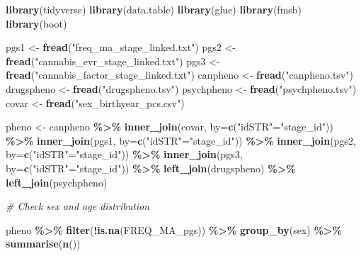\documentclass[
]{article}
\newenvironment{Shaded}{\begin{snugshade}}{\end{snugshade}}
\newcommand{\AttributeTok}[1]{\textcolor[rgb]{0.13,0.29,0.53}{#1}}
\newcommand{\CommentTok}[1]{\textcolor[rgb]{0.56,0.35,0.01}{\textit{#1}}}
\newcommand{\FunctionTok}[1]{\textcolor[rgb]{0.13,0.29,0.53}{\textbf{#1}}}
\newcommand{\NormalTok}[1]{#1}
\newcommand{\OtherTok}[1]{\textcolor[rgb]{0.56,0.35,0.01}{#1}}
\newcommand{\SpecialCharTok}[1]{\textcolor[rgb]{0.81,0.36,0.00}{\textbf{#1}}}
\newcommand{\StringTok}[1]{\textcolor[rgb]{0.31,0.60,0.02}{#1}}
\begin{document}
\begin{Shaded}
\begin{Highlighting}[]
\FunctionTok{library}\NormalTok{(tidyverse)}
\FunctionTok{library}\NormalTok{(data.table)}
\FunctionTok{library}\NormalTok{(glue)}
\FunctionTok{library}\NormalTok{(fmsb)}
\FunctionTok{library}\NormalTok{(boot)}

\NormalTok{pgs1 }\OtherTok{\textless{}{-}} \FunctionTok{fread}\NormalTok{(}\StringTok{"freq\_ma\_stage\_linked.txt"}\NormalTok{)}
\NormalTok{pgs2 }\OtherTok{\textless{}{-}} \FunctionTok{fread}\NormalTok{(}\StringTok{"cannabis\_evr\_stage\_linked.txt"}\NormalTok{)}
\NormalTok{pgs3 }\OtherTok{\textless{}{-}} \FunctionTok{fread}\NormalTok{(}\StringTok{"cannabis\_factor\_stage\_linked.txt"}\NormalTok{)}
\NormalTok{canpheno }\OtherTok{\textless{}{-}} \FunctionTok{fread}\NormalTok{(}\StringTok{"canpheno.tsv"}\NormalTok{)}
\NormalTok{drugspheno }\OtherTok{\textless{}{-}} \FunctionTok{fread}\NormalTok{(}\StringTok{"drugspheno.tsv"}\NormalTok{)}
\NormalTok{psychpheno }\OtherTok{\textless{}{-}} \FunctionTok{fread}\NormalTok{(}\StringTok{"psychpheno.tsv"}\NormalTok{)}
\NormalTok{covar }\OtherTok{\textless{}{-}} \FunctionTok{fread}\NormalTok{(}\StringTok{"sex\_birthyear\_pcs.csv"}\NormalTok{)}

\NormalTok{pheno }\OtherTok{\textless{}{-}}\NormalTok{ canpheno }\SpecialCharTok{\%\textgreater{}\%} 
  \FunctionTok{inner\_join}\NormalTok{(covar, }\AttributeTok{by=}\FunctionTok{c}\NormalTok{(}\StringTok{"idSTR"}\OtherTok{=}\StringTok{"stage\_id"}\NormalTok{)) }\SpecialCharTok{\%\textgreater{}\%} 
  \FunctionTok{inner\_join}\NormalTok{(pgs1, }\AttributeTok{by=}\FunctionTok{c}\NormalTok{(}\StringTok{"idSTR"}\OtherTok{=}\StringTok{"stage\_id"}\NormalTok{)) }\SpecialCharTok{\%\textgreater{}\%} 
  \FunctionTok{inner\_join}\NormalTok{(pgs2, }\AttributeTok{by=}\FunctionTok{c}\NormalTok{(}\StringTok{"idSTR"}\OtherTok{=}\StringTok{"stage\_id"}\NormalTok{)) }\SpecialCharTok{\%\textgreater{}\%} 
  \FunctionTok{inner\_join}\NormalTok{(pgs3, }\AttributeTok{by=}\FunctionTok{c}\NormalTok{(}\StringTok{"idSTR"}\OtherTok{=}\StringTok{"stage\_id"}\NormalTok{)) }\SpecialCharTok{\%\textgreater{}\%} 
  \FunctionTok{left\_join}\NormalTok{(drugspheno) }\SpecialCharTok{\%\textgreater{}\%} 
  \FunctionTok{left\_join}\NormalTok{(psychpheno) }

\CommentTok{\# Check sex and age distribution}

\NormalTok{pheno }\SpecialCharTok{\%\textgreater{}\%} 
  \FunctionTok{filter}\NormalTok{(}\SpecialCharTok{!}\FunctionTok{is.na}\NormalTok{(FREQ\_MA\_pgs)) }\SpecialCharTok{\%\textgreater{}\%} 
  \FunctionTok{group\_by}\NormalTok{(sex) }\SpecialCharTok{\%\textgreater{}\%} 
  \FunctionTok{summarise}\NormalTok{(}\FunctionTok{n}\NormalTok{())}


\end{Highlighting}
\end{Shaded}
\end{document}
